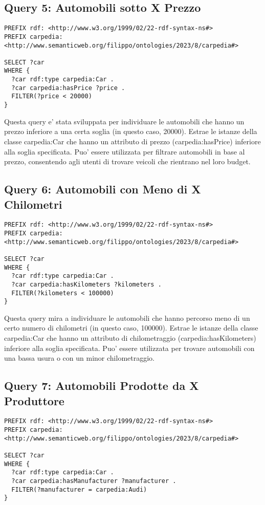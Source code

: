 \subsection{Query 5: Automobili sotto X Prezzo}

\begin{verbatim}
PREFIX rdf: <http://www.w3.org/1999/02/22-rdf-syntax-ns#>
PREFIX carpedia: <http://www.semanticweb.org/filippo/ontologies/2023/8/carpedia#>

SELECT ?car
WHERE {
  ?car rdf:type carpedia:Car .
  ?car carpedia:hasPrice ?price .
  FILTER(?price < 20000)
}
\end{verbatim}

Questa query e' stata sviluppata per individuare le automobili che hanno un prezzo inferiore a una certa
soglia (in questo caso, 20000). Estrae le istanze della classe carpedia:Car che hanno un attributo di prezzo
(carpedia:hasPrice) inferiore alla soglia specificata. Puo' essere utilizzata per filtrare automobili in base
al prezzo, consentendo agli utenti di trovare veicoli che rientrano nel loro budget.

\subsection{Query 6: Automobili con Meno di X Chilometri}

\begin{verbatim}
PREFIX rdf: <http://www.w3.org/1999/02/22-rdf-syntax-ns#>
PREFIX carpedia: <http://www.semanticweb.org/filippo/ontologies/2023/8/carpedia#>

SELECT ?car
WHERE {
  ?car rdf:type carpedia:Car .
  ?car carpedia:hasKilometers ?kilometers .
  FILTER(?kilometers < 100000)
}
\end{verbatim}


Questa query mira a individuare le automobili che hanno percorso meno di un certo numero di chilometri
(in questo caso, 100000). Estrae le istanze della classe carpedia:Car che hanno un attributo di chilometraggio
(carpedia:hasKilometers) inferiore alla soglia specificata.
Puo' essere utilizzata per trovare automobili con una bassa usura o con un minor chilometraggio.

\subsection{Query 7: Automobili Prodotte da X Produttore}

\begin{verbatim}
PREFIX rdf: <http://www.w3.org/1999/02/22-rdf-syntax-ns#>
PREFIX carpedia: <http://www.semanticweb.org/filippo/ontologies/2023/8/carpedia#>

SELECT ?car
WHERE {
  ?car rdf:type carpedia:Car .
  ?car carpedia:hasManufacturer ?manufacturer .
  FILTER(?manufacturer = carpedia:Audi)
}
\end{verbatim}


